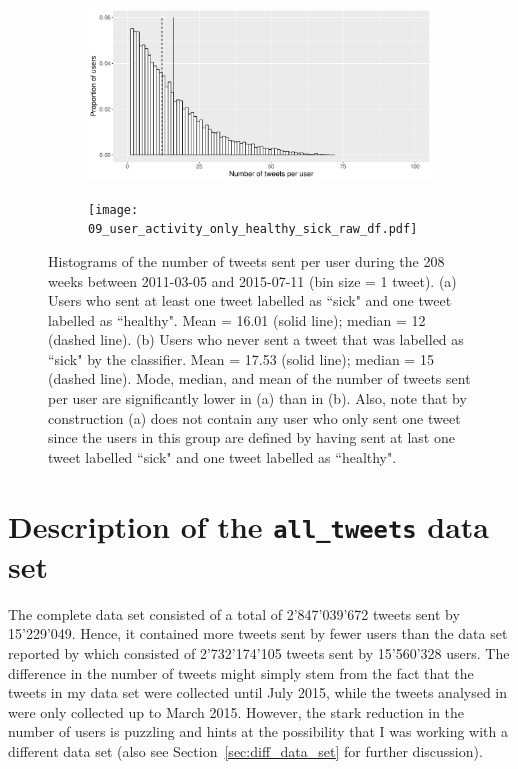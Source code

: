 \documentclass[11pt, a4paper,twoside]{report}\usepackage[]{graphicx}\usepackage[]{color}
\begin{document}
\begin{figure}[H]
\centering
  \begin{subfigure}[b]{1\textwidth}
  \includegraphics[width=1\linewidth]{08_user_activity_both_sick_raw_df.pdf}
  \caption{}
  \end{subfigure}
  \begin{subfigure}[b]{1\textwidth}
  \texttt{[image: 09\_user\_activity\_only\_healthy\_sick\_raw\_df.pdf]}
  \caption{}
  \end{subfigure}
  \caption{Histograms of the number of tweets sent per user during the 208 weeks between 2011-03-05 and 2015-07-11 (bin size = 1 tweet). (a) Users who sent at least one tweet labelled as ``sick" and one tweet labelled as ``healthy".  Mean = 16.01 (solid line); median = 12 (dashed line). (b) Users who never sent a tweet that was labelled as ``sick" by the classifier.  Mean = 17.53 (solid line); median = 15 (dashed line). Mode, median, and mean of the number of tweets sent per user are significantly lower in (a) than in (b). Also, note that by construction (a) does not contain any user who only sent one tweet since the users in this group are defined by having sent at last one tweet labelled ``sick" and one tweet labelled as ``healthy".}
  \label{fig:both_vs_healthy_only_hist}

\end{figure}

\section{Description of the \texttt{all\_tweets} data set}
\label{sec:full_set}

The complete data set consisted of a total of 2'847'039'672 tweets sent by 15'229'049. Hence, it contained more tweets sent by fewer users than the data set reported by \cite{bodnar_data_2015} which consisted of 2'732'174'105 tweets sent by 15'560'328 users. The difference in the number of tweets might simply stem from the fact that the tweets in my data set were collected until July 2015, while the tweets analysed in \cite{bodnar_data_2015} were only collected up to March 2015. However, the stark reduction in the number of users is puzzling and hints at the possibility that I was working with a different data set (also see Section~\ref{sec:diff_data_set} for further discussion).
\end{document}
